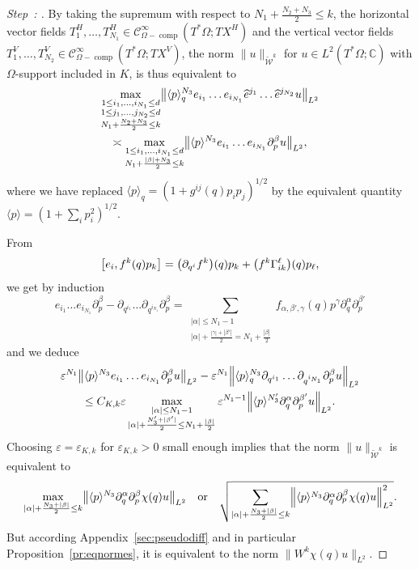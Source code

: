 \documentclass[AHL,Unicode,longabstracts]{cedram}
\newcommand{\C}{\mathbb{C}}
\newcommand{\clW}{\mathcal{W}}
\newcommand{\clC}{\mathcal{C}}
\DeclareMathOperator{\ccomp}{comp}
\let\oldhat\hat
\renewcommand*{\hat}[1]{\mathchoice{\widehat{#1}}{\widehat{#1}}{\oldhat{#1}}{\oldhat{#1}}}
\let\originalleft\left
\let\originalright\right
\renewcommand{\left}{\mathopen{}\mathclose\bgroup\originalleft}
\renewcommand{\right}{\aftergroup\egroup\originalright}
\newcounter{setofstep}
\newcounter{step}[setofstep]
\renewcommand{\thestep}{\Alph{step}}
\newenvironment{step}[1][]{\refstepcounter{step}\begin{proof}[{Step~\thestep\if#1\empty\else: #1\fi}]}{\let\qed\relax\end{proof}}
\begin{document}
\begin{proofc}
\begin{step}
By taking the supremum with respect to $N_{1}+\frac{N_{2}+N_{3}}{2}\leq k$, the horizontal vector fields $T_{1}^{H},\dots, T_{N_{1}}^{H}\in \clC^{\infty}_{\Omega-\ccomp}(T^{*}\Omega;TX^{H})$ and the vertical vector fields $T_{1}^{V},\dots, T_{N_{2}}^{V}\in \clC^{\infty}_{\Omega-\ccomp}(T^{*}\Omega;TX^{V})$, the norm $\|u\|_{\widetilde{\clW}^{k}}$ for $u\in L^{2}(T^{*}\Omega;\C)$ with $\Omega$-support included in $K$, is thus equivalent to
\begin{multline}\label{eq:normmax}
\max_{\substack{1\leq i_{1},\dots,i_{N_{1}}\leq d\\ 1\leq j_{1},\dots,j_{N_{2}}\leq d\\ N_{1}+\frac{N_{2}+N_{3}}{2}\leq k}}\left\|\langle p\rangle_{q}^{N_{3}}e_{i_{1}}\dots e_{i_{N_{1}}}\hat{e}^{j_{1}}\dots \hat{e}^{j_{N_{2}}}u\right\|_{L^{2}}\\
\asymp
\max_{\substack{1\leq i_{1},\dots,i_{N_{1}}\leq d\\ N_{1}+\frac{|\beta|+N_{3}}{2}\leq k}}
\left\|\langle p\rangle^{N_{3}}e_{i_{1}}\dots e_{i_{N_{1}}}\partial_{p}^{\beta}u\right\|_{L^{2}},
\end{multline}
where we have replaced $\langle p\rangle_{q}=(1+g^{ij}(q)p_{i}p_{j})^{1/2}$ by the equivalent quantity $\langle p\rangle=(1+\sum_{i}p_{i}^{2})^{1/2}$.

From
\[
\left[e_{i},f^{k}(q)p_{k}\right]=\left(\partial_{q^{i}}f^{k}\right)(q)p_{k}+\left(f^{k}\Gamma_{ik}^{\ell}\right)(q)p_{\ell},
\]
we get by induction
\[
e_{i_{1}}\dots e_{i_{N_{1}}}\partial_{p}^{\beta}-\partial_{q^{i_{1}}}\dots\partial_{q^{i_{N_{1}}}}\partial_{p}^{\beta}=\sum_{\substack{|\alpha|\leq N_{1}-1\\ |\alpha|+\frac{|\gamma|+|\beta'|}{2}=N_{1}+\frac{|\beta|}{2}}}f_{\alpha,\beta',\gamma}(q)p^{\gamma}\partial_{q}^{\alpha}\partial_{p}^{\beta'}
\]
and we deduce
\begin{multline*}
\varepsilon^{N_{1}}\left\|\langle p\rangle^{N_{3}}e_{i_{1}}\dots e_{i_{N_{1}}}\partial^{\beta}_{p}u\right\|_{L^{2}}-\varepsilon^{N_{1}}\left\|\langle p\rangle_{q}^{N_{3}}\partial_{q^{i_{1}}}\dots \partial_{q^{i_{N_{1}}}}\partial^{\beta}_{p}u\right\|_{L^{2}}
\\
\leq C_{K,k}\varepsilon\max_{\substack{|\alpha|\leq N_{1}-1\\
|\alpha|+\frac{N_{3}'+|\beta'|}{2}\leq N_{1}+\frac{|\beta|}{2}}}\varepsilon^{N_{1}-1}\left\|\langle p\rangle^{N_{3}'}\partial_{q}^{\alpha}\partial_{p}^{\beta'}u\right\|_{L^{2}}.
\end{multline*}
Choosing $\varepsilon=\varepsilon_{K,k}$ for $\varepsilon_{K,k}>0$ small enough implies that the norm $\|u\|_{\widetilde{\clW}^{k}}$ is equivalent to
\[
\max_{|\alpha|+\frac{N_{3}+|\beta|}{2}\leq k}\left\|\langle p\rangle^{N_{3}}\partial_{q}^{\alpha}\partial_{p}^{\beta}\chi(q)u\right\|_{L^{2}}
\quad\text{or}
\quad \sqrt{\sum_{|\alpha|+\frac{N_{3}+|\beta|}{2}\leq k}\left\|\langle p\rangle^{N_{3}}\partial_{q}^{\alpha}\partial_{p}^{\beta}\chi(q)u\right\|^{2}_{L^{2}}}.
\]
But according Appendix~\ref{sec:pseudodiff} and in particular Proposition~\ref{pr:eqnormes}, it is equivalent to the norm $\|W^{k}\chi(q)u\|_{L^{2}}$.\qedhere
\end{step}\let\qed\relax
\end{proofc}
\end{document}
